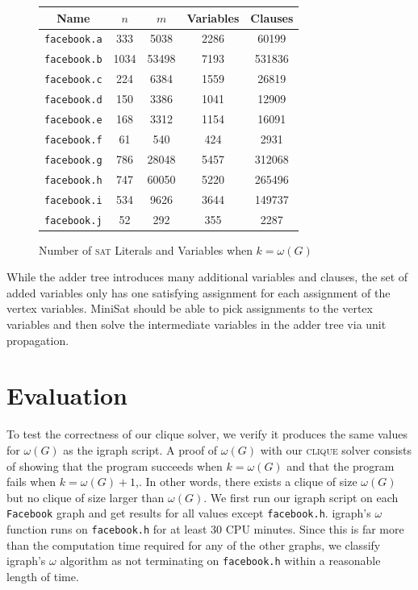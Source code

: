 \documentclass[]{article}
\newcommand{\clique}{\textsc{clique}}
\newcommand{\sat}{\textsc{sat}}
\begin{document}
	\begin{figure}[H]
		\centering
		\caption{Number of \sat{} Literals and Variables when $k = \omega(G)$}
		\begin{tabular}{|c|c|c|c|c|}
			\hline
			Name                & $n$  & $m$   & Variables & Clauses \\ \hline
			\texttt{facebook.a} & 333  & 5038  & 2286      & 60199    \\ \hline
			\texttt{facebook.b} & 1034 & 53498 & 7193      & 531836   \\ \hline
			\texttt{facebook.c} & 224  & 6384  & 1559      & 26819    \\ \hline
			\texttt{facebook.d} & 150  & 3386  & 1041      & 12909    \\ \hline
			\texttt{facebook.e} & 168  & 3312  & 1154      & 16091    \\ \hline
			\texttt{facebook.f} & 61   & 540   & 424       & 2931     \\ \hline
			\texttt{facebook.g} & 786  & 28048 & 5457      & 312068   \\ \hline
			\texttt{facebook.h} & 747  & 60050 & 5220      & 265496   \\ \hline
			\texttt{facebook.i} & 534  & 9626  & 3644      & 149737   \\ \hline
			\texttt{facebook.j} & 52   & 292   & 355       & 2287     \\ \hline
		\end{tabular}
	\end{figure}
	
	While the adder tree introduces many additional variables and clauses, the set of added variables only has one satisfying assignment for each assignment of the vertex variables. MiniSat should be able to pick assignments to the vertex variables and then solve the intermediate variables in the adder tree via unit propagation\cite{matesoos}.

	\section{Evaluation}
	
	To test the correctness of our clique solver, we verify it produces the same values for $\omega(G)$ as the igraph script. A proof of $\omega(G)$ with our \clique{} solver consists of showing that the program succeeds when $k = \omega(G)$ and that the program fails when $k = \omega(G) + 1$,. In other words, there exists a clique of size $\omega(G)$ but no clique of size larger than $\omega(G)$. We first run our igraph script on each \texttt{Facebook} graph and get results for all values except \texttt{facebook.h}. igraph's $\omega$ function runs on \texttt{facebook.h} for at least 30 CPU minutes. Since this is far more than the computation time required for any of the other graphs, we classify igraph's $\omega$ algorithm as not terminating on \texttt{facebook.h} within a reasonable length of time.
	
\end{document}
